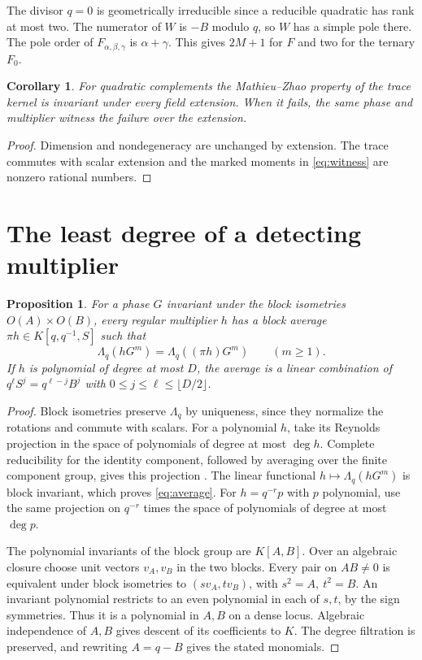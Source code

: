 \documentclass[11pt]{article}
\newtheorem{proposition}[theorem]{Proposition}
\newtheorem{corollary}[theorem]{Corollary}
\newcommand{\Lq}{\Lambda_q}
\begin{document}
The divisor \(q=0\) is geometrically irreducible since a reducible
quadratic has rank at most two. The numerator of \(W\) is \(-B\)
modulo \(q\), so \(W\) has a simple pole there. The pole order of
\(F_{\alpha,\beta,\gamma}\) is \(\alpha+\gamma\). This gives
\(2M+1\) for \(F\) and two for the ternary \(F_0\).

\begin{corollary}\label{cor:scalar-extension}
For quadratic complements the Mathieu--Zhao property of the trace
kernel is invariant under every field extension. When it fails,
the same phase and multiplier witness the failure over the
extension.
\end{corollary}

\begin{proof}
Dimension and nondegeneracy are unchanged by extension. The trace
commutes with scalar extension and the marked moments in
\eqref{eq:witness} are nonzero rational numbers.
\end{proof}

\section{The least degree of a detecting multiplier}\label{sec:cutoff}

\begin{proposition}\label{prop:average}
For a phase \(G\) invariant under the block isometries
\(O(A)\times O(B)\), every regular multiplier \(h\) has a block
average \(\pi h\in K[q,q^{-1},S]\) such that
\begin{equation}\label{eq:average}
 \Lq(hG^m)=\Lq((\pi h)G^m)\qquad(m\ge1).
\end{equation}
If \(h\) is polynomial of degree at most \(D\), the average is a
linear combination of \(q^\ell S^j=q^{\ell-j}B^j\) with
\(0\le j\le\ell\le\lfloor D/2\rfloor\).
\end{proposition}

\begin{proof}
Block isometries preserve \(\Lq\) by uniqueness, since they normalize
the rotations and commute with scalars. For a polynomial \(h\), take
its Reynolds projection in the space of polynomials of degree at
most \(\deg h\). Complete reducibility for the identity component,
followed by averaging over the finite component group, gives this
projection \cite[Cor.~22.43]{Milne}. The linear functional
\(h\mapsto\Lq(hG^m)\) is block invariant, which proves \eqref{eq:average}.
For \(h=q^{-r}p\) with \(p\) polynomial, use the same projection on
\(q^{-r}\) times the space of polynomials of degree at most \(\deg p\).

The polynomial invariants of the block group are \(K[A,B]\).
Over an algebraic closure choose unit vectors \(v_A,v_B\) in the two
blocks. Every pair on \(AB\ne0\) is equivalent under block isometries
to \((s v_A,t v_B)\), with \(s^2=A,\ t^2=B\).
An invariant polynomial restricts to an even polynomial in each of
\(s,t\), by the sign symmetries. Thus it is a polynomial in \(A,B\)
on a dense locus. Algebraic independence of \(A,B\) gives descent of
its coefficients to \(K\). The degree filtration is preserved, and
rewriting \(A=q-B\) gives the stated monomials.
\end{proof}
\end{document}
